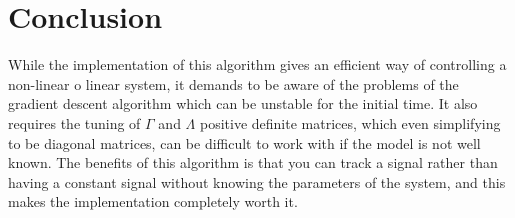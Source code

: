\documentclass[journal]{IEEEtran}
\begin{document}
%


\section{Conclusion}
    While the implementation of this algorithm gives an efficient way of controlling a non-linear o linear system, it demands to be aware of the problems of the gradient descent algorithm which can be unstable for the initial time. It also requires the tuning of $\Gamma$ and $\Lambda$ positive definite matrices, which even simplifying to be diagonal matrices, can be difficult to work with if the model is not well known. The benefits of this algorithm is that you can track a signal rather than having a constant signal without knowing the parameters of the system, and this makes the implementation completely worth it.
\end{document}
